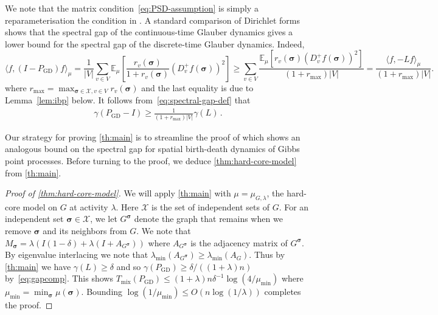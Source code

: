 \documentclass[10pt]{amsart}
\newcommand{\E}{\mathbb{E}}
\newcommand{\sigmabf}{ \boldsymbol{\sigma} }
\begin{document}
	We note that the matrix condition~\eqref{eq:PSD-assumption} is simply a reparameterisation the condition in \cite[Thm.~1.9]{chen2025rapid}. A standard comparison of Dirichlet forms shows that the spectral gap of the continuous-time Glauber dynamics gives a lower bound for the spectral gap of the discrete-time Glauber dynamics. Indeed, 
	\[
	\langle f,(I-P_{\mathrm{GD}})f\rangle_\mu
	=
	\frac{1}{|V|}
	\sum_{v\in V}
	\E_\mu\left[\frac{r_v(\sigmabf)}{1+r_v(\sigmabf)}
	(D_v^+f(\sigmabf))^2\right] \geq \sum_{v\in V} \frac{
		\E_\mu\left[r_v(\sigmabf)
		(D_v^+f(\sigmabf))^2\right]}{(1+r_{\max})|V|} =  \frac{\langle f,-Lf\rangle_\mu}{(1+r_{\max})|V|} .
	\]
	where $r_{\max}=\max_{\sigmabf\in\mathcal X, v\in V} r_v(\sigmabf)$ and the last equality is due to Lemma~\ref{lem:ibp} below.  
	It follows from~\eqref{eq:spectral-gap-def} that  
	\begin{align}\label{eq:gapcomp}
		\gamma(P_{\mathrm{GD}}-I)
		\ge
		\frac{1}{(1+r_{\max})|V|}\gamma(L) \,.
	\end{align}
	
	
	
	
	
	Our strategy for proving \cref{th:main} is to streamline  the proof of \cite[Thm.~4.2]{kondratiev2013spectral} which shows an analogous bound on the spectral gap for spatial birth-death dynamics of Gibbs point processes. Before turning to the proof, we deduce \cref{thm:hard-core-model} from \cref{th:main}.
	
	
	\begin{proof}[Proof of \cref{thm:hard-core-model}]
		We will apply \cref{th:main} with $\mu=\mu_{G,\lambda}$, the hard-core model on $G$ at activity $\lambda$.  Here $\mathcal{X}$ is the set of independent sets of $G$.  For an independent set $\sigmabf \in \mathcal{X}$, we let $G^{\sigmabf}$ denote the graph that remains when we remove $\sigmabf$ and its neighbors from $G$.  We note that $M_{\sigmabf} = \lambda\left(I(1 - \delta) + \lambda(I + A_{G^{\sigmabf}}) \right)$ where $A_{G^{\sigmabf}}$ is the adjacency matrix of $G^{\sigmabf}$.  By eigenvalue interlacing we note that $\lambda_{\min}(A_{G^{\sigmabf}}) \geq \lambda_{\min}(A_G)$.  Thus by \cref{th:main} we have $\gamma(L) \geq \delta$ and so $\gamma(P_{\mathrm{GD}}) \geq \delta/((1+\lambda)n)$ by~\eqref{eq:gapcomp}. 
		This shows $T_{\mathrm{mix}}(P_{\mathrm{GD}}) \leq (1+\lambda)n\delta^{-1}\log\left(4/\mu_{\min}\right)$ where $\mu_{\min}=\min_{\sigmabf} \mu(\sigmabf)$.  Bounding $\log(1/\mu_{\min}) \leq O(n \log(1/\lambda))$ completes the proof.
	\end{proof}
	
\end{document}
